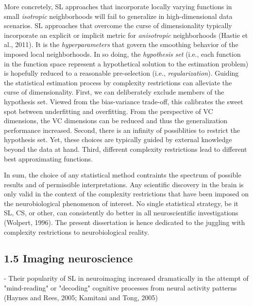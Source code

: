\documentclass[authoryear,review,3p]{elsarticle}
\begin{document}
More concretely,
SL approaches that incorporate locally varying functions
in small \textit{isotropic} neighborhoods
will fail to generalize in high-dimensional data scenarios.
SL approaches that overcome the curse of dimensionality typically
incorporate an explicit or implicit metric for
\textit{anisotropic} neighborhoods
(Hastie et al., 2011).
%
It is the \textit{hyperparameters} that govern the
smoothing behavior of the imposed local neighborhoods.
%
In so doing,
the \textit{hypothesis set} (i.e., each function in the function space
represent a hypothetical solution to
the estimation problem) is hopefully reduced to
a reasonable pre-selection (i.e., \textit{regularization}).
%
Guiding the statistical estimation process by
complexity restrictions can alleviate the curse of dimensionality.
First,
we can deliberately exclude members of the hypothesis set.
Viewed from the bias-variance trade-off, this calibrates
the sweet spot between underfitting and overfitting.
From the perspective of VC dimensions,
the VC dimensions can be reduced and thus the generalization performance
increased.
%
Second, there is an infinity of possiblities to restrict the hypothesis set.
Yet, these choices are typically guided by external knowledge beyond
the data at hand.
%
Third,
different complexity restrictions lead to different
best approximating functions.



In sum,
the choice of any statistical method contraints
the spectrum of possible results and of permissible interpretations.
Any scientific discovery in the brain is only valid in the
context of the complexity restrictions that have been imposed
on the neurobiological phenomenon of interest.
%
No single statistical strategy, be it SL, CS, or other,
can consistently
do better in all neuroscientific investigations
(Wolpert, 1996).
%
The present dissertation
is hence dedicated to the juggling with
complexity restrictions to
neurobiological reality.



\subsection*{1.5 Imaging neuroscience}


- Their popularity of SL in neuroimaging increased dramatically in the attempt of "mind-reading" or "decoding" cognitive processes from neural activity patterns (Haynes and Rees, 2005; Kamitani and Tong, 2005)
\end{document}
